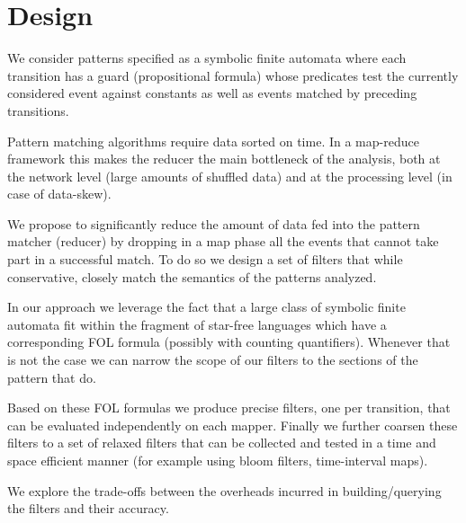 \section{Design}

We consider patterns specified as a symbolic finite automata where each
transition has a guard (propositional formula) whose predicates test the
currently considered event against constants as well as events matched by
preceding transitions.
   
Pattern matching algorithms require data sorted on time.
In a map-reduce framework this makes the reducer the main bottleneck of the
analysis, both at the network level (large amounts of shuffled data) and at
the processing level (in case of data-skew).



We propose to significantly reduce the amount of data fed into the pattern
matcher (reducer) by dropping in a map phase all the events that cannot take
part in a successful match.
To do so we design a set of filters that while conservative, closely match the
semantics of the patterns analyzed.

\begin{comment}
We propose three levels of abstraction.
The first enforces the join constraints between different transitions as
expressed by join predicates within the transition guards.
The second one further imposes time windowing constraints (all events of a
successful match must occur within a timeout of the first event in the match).
Finally the last one enforces ordering constraints between {\em consecutive}
transitions of the pattern.
\end{comment}

In our approach we leverage the fact that a large class of symbolic finite
automata fit within the fragment of star-free languages which
have a corresponding FOL formula (possibly with counting quantifiers).
Whenever that is not the case we can narrow the scope of our filters to the
sections of the pattern that do.
 
Based on these FOL formulas we produce precise filters, one per transition, 
that can be evaluated independently on each mapper.
Finally we further coarsen these filters to a set of relaxed filters
that can be collected and tested in a time and space efficient manner (for
example using bloom filters, time-interval maps).

We explore the trade-offs between the overheads incurred in building/querying
the filters and their accuracy. 


